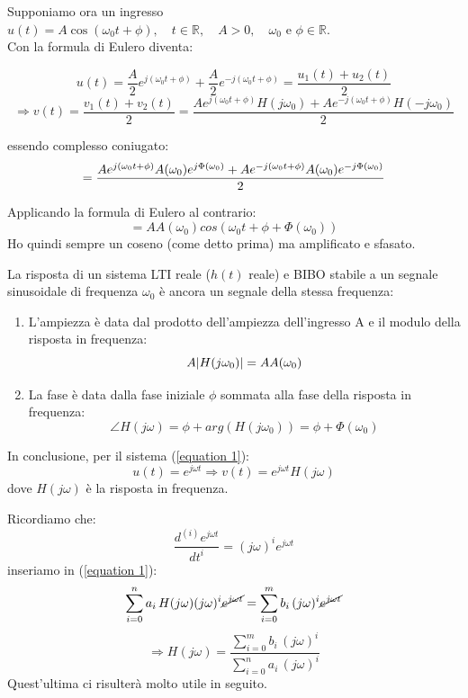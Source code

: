 	Supponiamo ora un ingresso $ u(t)=A \cos(\omega_0 t+\phi), \quad t \in \mathbb{R},\quad A>0, \quad \omega_0 \text{ e } \phi \in \mathbb{R} $.\\
	
	Con la formula di Eulero diventa:
	
	\begin{equation*}
		u(t)=\frac{A}{2}e^{j(\omega_0 t + \phi)}+\frac{A}{2}e^{-j(\omega_0 t + \phi)} 
			= \frac{u_1(t)+ u_2(t)}{2}
	\end{equation*}
	\begin{equation*}
		\Rightarrow v(t)=
			\frac{v_1(t)+ v_2(t)}{2}
			= \frac{A e^{j(\omega_0 t + \phi)}  H(j\omega_0)+ A e^{-j(\omega_0 t + \phi) }H(-j\omega_0)}{2}
	\end{equation*}
	
	essendo complesso coniugato:
	\begin{equation*}
			= \frac{A e^{j(\omega_0 t + \phi)} A(\omega_0) e^{j\Phi(\omega_0)} + A e^{-j(\omega_0 t + \phi)} A(\omega_0) e^{-j\Phi(\omega_0)}}{2}\\
	\end{equation*}
	
	Applicando la formula di Eulero al contrario:
	\begin{equation*}
	=A A(\omega_0)cos(\omega_0 t+\phi+\Phi(\omega_0))
	\end{equation*}
	Ho quindi sempre un coseno (come detto prima) ma amplificato e sfasato.
	
	La risposta di un sistema LTI reale ($ h(t) $ reale) e BIBO stabile a un segnale sinusoidale di frequenza $ \omega_0 $ è ancora un segnale della stessa frequenza:
	
	\begin{enumerate}	
	\item L'ampiezza è data dal prodotto dell'ampiezza dell'ingresso A e il modulo della risposta in frequenza:
	\begin{equation*}
		A \lvert H(j\omega_0)\rvert=AA(\omega_0)
	\end{equation*}
	\item La fase è data dalla fase iniziale $ \phi $ sommata alla fase della risposta in frequenza:
	\begin{equation*}
		\angle H(j\omega) = \phi + arg(H(j\omega_0)) = \phi + \Phi(\omega_0)
	\end{equation*}
	\end{enumerate}

	In conclusione, per il sistema (\ref{equation 1}):
	\[
		u(t)= e^{j\omega t}
		\Rightarrow v(t) = e^{j\omega t} H(j\omega)
	\]
	dove  $ H(j\omega) $ è la risposta in frequenza.
	
	Ricordiamo che:
	\[
		\frac{d^{(i)}e^{j\omega t}}{dt^i} = (j\omega)^i e^{j\omega t}
	\]
	inseriamo in (\ref{equation 1}): 
	\[
		\sum_{i=0}^{n}a_i\, H(j\omega)(j\omega)^i \cancel{e^{j\omega t}}
		= \sum_{i=0}^{m}b_i \, (j\omega)^i \cancel{e^{j\omega t}}
	\]
	\[
		\Rightarrow H(j\omega) = \frac{\sum_{i=0}^{m}b_i \, (j\omega)^i}{\sum_{i=0}^{n}a_i\, (j\omega)^i}
	\]
	Quest'ultima ci risulterà molto utile in seguito.



